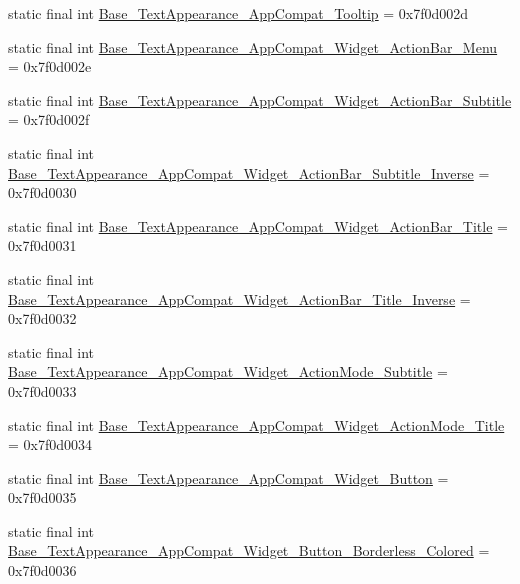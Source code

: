 \begin{DoxyCompactItemize}
static final int \mbox{\hyperlink{classandroid_1_1support_1_1v7_1_1appcompat_1_1R_1_1style_a634bdb8186486bedce66c773a4c440ba}{Base\+\_\+\+Text\+Appearance\+\_\+\+App\+Compat\+\_\+\+Tooltip}} = 0x7f0d002d
\item 
static final int \mbox{\hyperlink{classandroid_1_1support_1_1v7_1_1appcompat_1_1R_1_1style_aa05f850bb2a20365f1c92a78dc494e63}{Base\+\_\+\+Text\+Appearance\+\_\+\+App\+Compat\+\_\+\+Widget\+\_\+\+Action\+Bar\+\_\+\+Menu}} = 0x7f0d002e
\item 
static final int \mbox{\hyperlink{classandroid_1_1support_1_1v7_1_1appcompat_1_1R_1_1style_a2a6e58456861211a5d6739236375d39c}{Base\+\_\+\+Text\+Appearance\+\_\+\+App\+Compat\+\_\+\+Widget\+\_\+\+Action\+Bar\+\_\+\+Subtitle}} = 0x7f0d002f
\item 
static final int \mbox{\hyperlink{classandroid_1_1support_1_1v7_1_1appcompat_1_1R_1_1style_a7307f49dc5cf0eee3154ce160a6f4ff7}{Base\+\_\+\+Text\+Appearance\+\_\+\+App\+Compat\+\_\+\+Widget\+\_\+\+Action\+Bar\+\_\+\+Subtitle\+\_\+\+Inverse}} = 0x7f0d0030
\item 
static final int \mbox{\hyperlink{classandroid_1_1support_1_1v7_1_1appcompat_1_1R_1_1style_a172e7de6432bf1869463c82f2299a826}{Base\+\_\+\+Text\+Appearance\+\_\+\+App\+Compat\+\_\+\+Widget\+\_\+\+Action\+Bar\+\_\+\+Title}} = 0x7f0d0031
\item 
static final int \mbox{\hyperlink{classandroid_1_1support_1_1v7_1_1appcompat_1_1R_1_1style_a69c4b6d6b5c8b2c1cf77fe514dd5c730}{Base\+\_\+\+Text\+Appearance\+\_\+\+App\+Compat\+\_\+\+Widget\+\_\+\+Action\+Bar\+\_\+\+Title\+\_\+\+Inverse}} = 0x7f0d0032
\item 
static final int \mbox{\hyperlink{classandroid_1_1support_1_1v7_1_1appcompat_1_1R_1_1style_a1dd69fd2c890662bdfa8c771a70447d3}{Base\+\_\+\+Text\+Appearance\+\_\+\+App\+Compat\+\_\+\+Widget\+\_\+\+Action\+Mode\+\_\+\+Subtitle}} = 0x7f0d0033
\item 
static final int \mbox{\hyperlink{classandroid_1_1support_1_1v7_1_1appcompat_1_1R_1_1style_a80946fe67e73e49cfbb18f10b23c24df}{Base\+\_\+\+Text\+Appearance\+\_\+\+App\+Compat\+\_\+\+Widget\+\_\+\+Action\+Mode\+\_\+\+Title}} = 0x7f0d0034
\item 
static final int \mbox{\hyperlink{classandroid_1_1support_1_1v7_1_1appcompat_1_1R_1_1style_a6b427ebdf19f05932f60ad867fb296aa}{Base\+\_\+\+Text\+Appearance\+\_\+\+App\+Compat\+\_\+\+Widget\+\_\+\+Button}} = 0x7f0d0035
\item 
static final int \mbox{\hyperlink{classandroid_1_1support_1_1v7_1_1appcompat_1_1R_1_1style_a56f489a99ffc73f4465f5931572add30}{Base\+\_\+\+Text\+Appearance\+\_\+\+App\+Compat\+\_\+\+Widget\+\_\+\+Button\+\_\+\+Borderless\+\_\+\+Colored}} = 0x7f0d0036

\end{DoxyCompactItemize}
